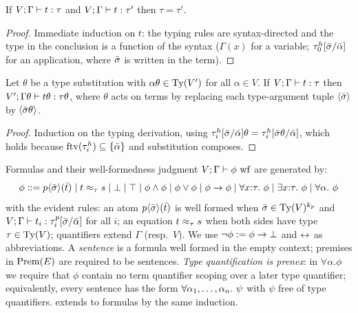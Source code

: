 \begin{lemma}
  \label{lem:unique-types}
  If $V;\Gamma\vdash t : \tau$ and $V;\Gamma\vdash t : \tau'$ then
  $\tau = \tau'$.
\end{lemma}

\begin{proof}
  Immediate induction on $t$: the typing rules are syntax-directed and the
  type in the conclusion is a function of the syntax ($\Gamma(x)$ for a
  variable; $\tau^h_0[\bar{\sigma}/\bar{\alpha}]$ for an application, where
  $\bar{\sigma}$ is written in the term).
\end{proof}

\begin{lemma}
  \label{lem:instantiation}
  Let $\theta$ be a type substitution with $\alpha\theta \in \mathrm{Ty}(V')$ for
  all $\alpha \in V$.  If $V;\Gamma\vdash t : \tau$ then
  $V';\Gamma\theta\vdash t\theta : \tau\theta$, where $\theta$ acts on
  terms by replacing each type-argument tuple
  $\langle\bar{\sigma}\rangle$ by $\langle\bar{\sigma}\theta\rangle$.
\end{lemma}

\begin{proof}
  Induction on the typing derivation, using
  $\tau^h_i[\bar{\sigma}/\bar{\alpha}]\theta =
  \tau^h_i[\bar{\sigma}\theta/\bar{\alpha}]$, which holds because
  $\mathrm{ftv}(\tau^h_i) \subseteq \{\bar{\alpha}\}$ and substitution composes.
\end{proof}

\begin{definition}[Formulas]
  \label{def:formulas}
  Formulas and their well-formedness judgment $V;\Gamma\vdash \phi\
  \mathrm{wf}$ are generated by:
  \[
    \phi ::= p\langle\bar{\sigma}\rangle(\bar{t})
    \mid t \approx_{\tau} s \mid \bot \mid \top
    \mid \phi \wedge \phi \mid \phi \vee \phi \mid \phi \rightarrow \phi
    \mid \forall x{:}\tau.\ \phi \mid \exists x{:}\tau.\ \phi
    \mid \forall \alpha.\ \phi
  \]
  with the evident rules: an atom $p\langle\bar{\sigma}\rangle(\bar{t})$ is
  well formed when $\bar{\sigma} \in \mathrm{Ty}(V)^{k_p}$ and
  $V;\Gamma\vdash t_i : \tau^p_i[\bar{\sigma}/\bar{\alpha}]$ for all $i$; an
  equation $t \approx_{\tau} s$ when both sides have type $\tau \in \mathrm{Ty}(V)$;
  quantifiers extend $\Gamma$ (resp.\ $V$).  We use
  $\neg\phi \mathrel{:=} \phi \rightarrow \bot$ and $\leftrightarrow$ as abbreviations.  A
  \emph{sentence} is a formula well formed in the empty context; premises
  in $\mathrm{Prem}(E)$ are required to be sentences.  \emph{Type
  quantification is prenex}: in $\forall\alpha.\phi$ we require that
  $\phi$ contain no term quantifier scoping over a later type quantifier;
  equivalently, every sentence has the form
  $\forall \alpha_1,\dots,\alpha_{n}.\ \psi$ with $\psi$ free of type quantifiers.
  \Cref{lem:instantiation} extends to formulas by the same induction.
\end{definition}

